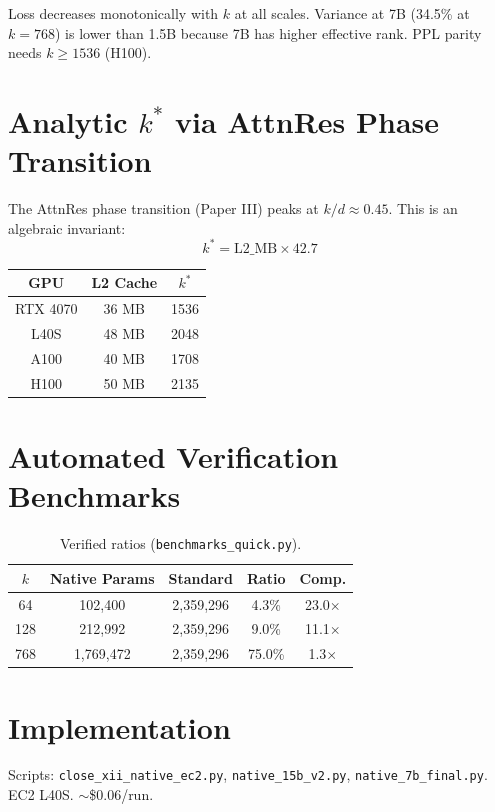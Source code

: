 \documentclass[11pt]{article}
\begin{document}
Loss decreases monotonically with $k$ at all scales. Variance at 7B (34.5\% at $k=768$) is lower than 1.5B because 7B has higher effective rank. PPL parity needs $k \ge 1536$ (H100).


\section{Analytic $k^*$ via AttnRes Phase Transition}
The AttnRes phase transition (Paper III) peaks at $k/d \approx 0.45$. This is an algebraic invariant:
\begin{equation}
k^* = \mathrm{L2\_MB} \times 42.7
\end{equation}
\begin{table}[h]\centering
\begin{tabular}{ccc}\toprule
GPU & L2 Cache & $k^*$ \\\midrule
RTX 4070 & 36 MB & 1536 \\
L40S & 48 MB & 2048 \\
A100 & 40 MB & 1708 \\
H100 & 50 MB & 2135 \\\bottomrule
\end{tabular}\end{table}


\section{Automated Verification Benchmarks}
\begin{table}[h]\centering
\begin{tabular}{ccccc}\toprule
$k$ & Native Params & Standard & Ratio & Comp. \\\midrule
64 & 102,400 & 2,359,296 & 4.3\% & 23.0$\times$ \\
128 & 212,992 & 2,359,296 & 9.0\% & 11.1$\times$ \\
768 & 1,769,472 & 2,359,296 & 75.0\% & 1.3$\times$ \\\bottomrule
\end{tabular}
\caption{Verified ratios (\texttt{benchmarks\_quick.py}).}
\end{table}

\section{Implementation}
Scripts: \texttt{close\_xii\_native\_ec2.py}, \texttt{native\_15b\_v2.py}, \texttt{native\_7b\_final.py}. EC2 L40S. $\sim$\$0.06/run.
\end{document}
